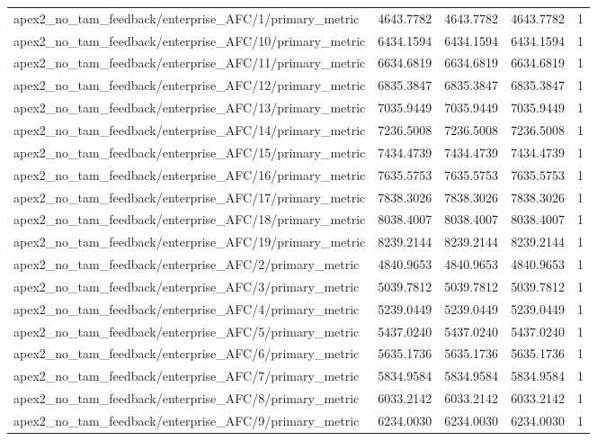 \begin{table}[h]
\begin{tabular}{lrrrr}
apex2_no_tam_feedback/enterprise_AFC/1/primary_metric & 4643.7782 & 4643.7782 & 4643.7782 & 1 \\
apex2_no_tam_feedback/enterprise_AFC/10/primary_metric & 6434.1594 & 6434.1594 & 6434.1594 & 1 \\
apex2_no_tam_feedback/enterprise_AFC/11/primary_metric & 6634.6819 & 6634.6819 & 6634.6819 & 1 \\
apex2_no_tam_feedback/enterprise_AFC/12/primary_metric & 6835.3847 & 6835.3847 & 6835.3847 & 1 \\
apex2_no_tam_feedback/enterprise_AFC/13/primary_metric & 7035.9449 & 7035.9449 & 7035.9449 & 1 \\
apex2_no_tam_feedback/enterprise_AFC/14/primary_metric & 7236.5008 & 7236.5008 & 7236.5008 & 1 \\
apex2_no_tam_feedback/enterprise_AFC/15/primary_metric & 7434.4739 & 7434.4739 & 7434.4739 & 1 \\
apex2_no_tam_feedback/enterprise_AFC/16/primary_metric & 7635.5753 & 7635.5753 & 7635.5753 & 1 \\
apex2_no_tam_feedback/enterprise_AFC/17/primary_metric & 7838.3026 & 7838.3026 & 7838.3026 & 1 \\
apex2_no_tam_feedback/enterprise_AFC/18/primary_metric & 8038.4007 & 8038.4007 & 8038.4007 & 1 \\
apex2_no_tam_feedback/enterprise_AFC/19/primary_metric & 8239.2144 & 8239.2144 & 8239.2144 & 1 \\
apex2_no_tam_feedback/enterprise_AFC/2/primary_metric & 4840.9653 & 4840.9653 & 4840.9653 & 1 \\
apex2_no_tam_feedback/enterprise_AFC/3/primary_metric & 5039.7812 & 5039.7812 & 5039.7812 & 1 \\
apex2_no_tam_feedback/enterprise_AFC/4/primary_metric & 5239.0449 & 5239.0449 & 5239.0449 & 1 \\
apex2_no_tam_feedback/enterprise_AFC/5/primary_metric & 5437.0240 & 5437.0240 & 5437.0240 & 1 \\
apex2_no_tam_feedback/enterprise_AFC/6/primary_metric & 5635.1736 & 5635.1736 & 5635.1736 & 1 \\
apex2_no_tam_feedback/enterprise_AFC/7/primary_metric & 5834.9584 & 5834.9584 & 5834.9584 & 1 \\
apex2_no_tam_feedback/enterprise_AFC/8/primary_metric & 6033.2142 & 6033.2142 & 6033.2142 & 1 \\
apex2_no_tam_feedback/enterprise_AFC/9/primary_metric & 6234.0030 & 6234.0030 & 6234.0030 & 1 \\

\end{tabular}
\end{table}
